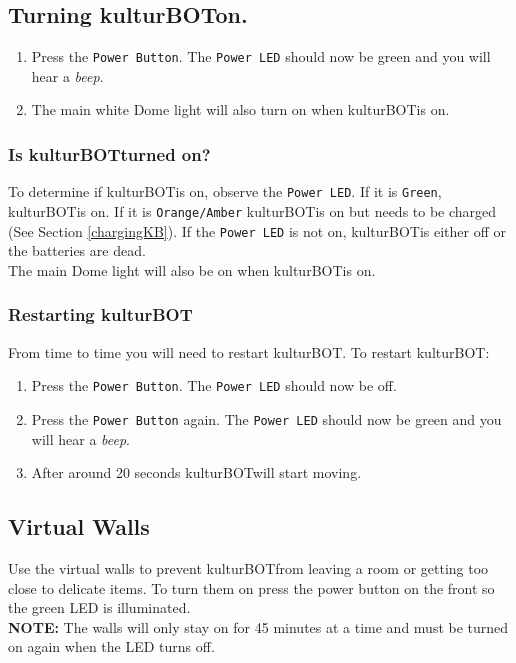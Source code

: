 \documentclass[]{article}
\newcommand{\kb}{kulturBOT}
\newcommand{\kbspace}{\kb \space}
\begin{document}
\subsection{Turning \kbspace on.}
\begin{enumerate}
\item Press the \texttt{Power Button}. The \texttt{Power LED} should now be green and you will hear a \textit{beep}.
\item The main white Dome light will also turn on when \kbspace is on.
\end{enumerate}

\subsubsection{Is \kbspace turned on?}
\label{isKbOn}
To determine if \kbspace is on, observe the \texttt{Power LED}. If it is \texttt{Green}, \kbspace is on. If it is \texttt{Orange/Amber} \kbspace is on but needs to be charged (See Section \ref{chargingKB}). If the \texttt{Power LED} is not on, \kbspace is either off or the batteries are dead.\\
The main Dome light will also be on when \kbspace is on.

\subsubsection{Restarting \kb}
\label{restartKb}
From time to time you will need to restart \kbspace. To restart \kb:

\begin{enumerate}
\item Press the \texttt{Power Button}. The \texttt{Power LED} should now be off.
\item Press the \texttt{Power Button} again. The \texttt{Power LED} should now be green and you will hear a \textit{beep}.
\item After around 20 seconds \kbspace will start moving.
\end{enumerate}

\subsection{Virtual Walls}
Use the virtual walls to prevent \kbspace from leaving a room or getting too close to delicate items. To turn them on press the power button on the front so the green LED is illuminated.\\

\textbf{NOTE: } The walls will only stay on for 45 minutes at a time and must be turned on again when the LED turns off.
\end{document}
